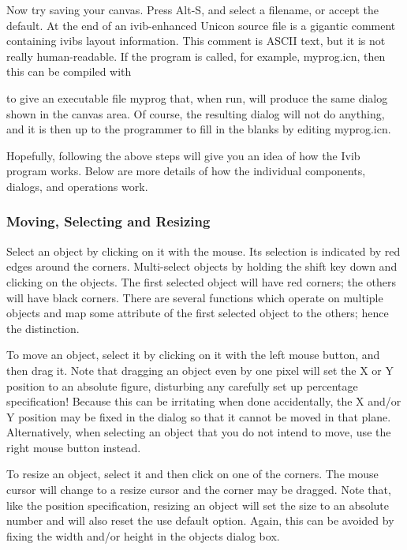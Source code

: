 Now try saving your canvas. Press Alt-S, and select a filename, or
accept the default. At the end of an ivib-enhanced Unicon source file
is a gigantic comment containing ivib{\textquotesingle}s layout
information. This comment is ASCII text, but it is not
really human-readable. If the program is called, for example,
\textsf{myprog.icn}, then this can be compiled with


\noindent
to give an executable file \textsf{myprog} that, when run, will produce
the same dialog shown in the canvas area. Of course, the resulting
dialog will not do anything, and it is then up to the programmer to
fill in the blanks by editing \textsf{myprog.icn}.

Hopefully, following the above steps will give you an idea of how the
Ivib program works. Below are more details of how the individual
components, dialogs, and operations work.

\subsubsection{Moving, Selecting and Resizing}
Select an object by clicking on it with the mouse. Its selection is
indicated by red edges around the corners. Multi-select objects by
holding the shift key down and clicking on the objects. The first
selected object will have red corners; the others will have black
corners. There are several functions which operate on multiple objects
and map some attribute of the first selected object to the others;
hence the distinction.

To move an object, select it by clicking on it with the left mouse
button, and then drag it. Note that dragging an object even by one
pixel will set the X or Y position to an absolute figure, disturbing
any carefully set up percentage specification! Because this can be
irritating when done accidentally, the X and/or Y position may be fixed
in the dialog so that it cannot be moved in that plane. Alternatively,
when selecting an object that you do not intend to move, use the right
mouse button instead.

To resize an object, select it and then click on one of the corners. The
mouse cursor will change to a resize cursor and the corner may be
dragged. Note that, like the position specification, resizing an object
will set the size to an absolute number and will also reset the
{\textquotedbl}use default{\textquotedbl} option. Again, this can be
avoided by fixing the width and/or height in the
object{\textquotesingle}s dialog box.

